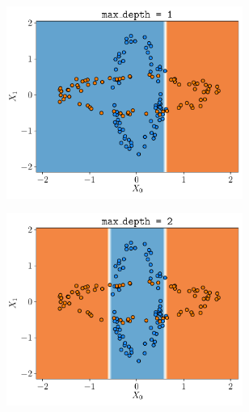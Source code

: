 \documentclass[a4paper, 12pt]{article}
\begin{document}
\begin{enumerate}[label = (\alph*)]
        \begin{figure}[h]
            \centering
            \begin{subfigure}{0.49\textwidth}
                \centering
        	    \includegraphics[width=0.85\textwidth]{resources/pdf/make_data1_depth1.pdf}
            \end{subfigure}
            \begin{subfigure}{0.49\textwidth}
                \centering
        	    \includegraphics[width=0.85\textwidth]{resources/pdf/make_data1_depth2.pdf}
            \end{subfigure}
            \begin{subfigure}{0.49\textwidth}
                \centering

\end{subfigure}
\end{figure}
\end{enumerate}
\end{document}
